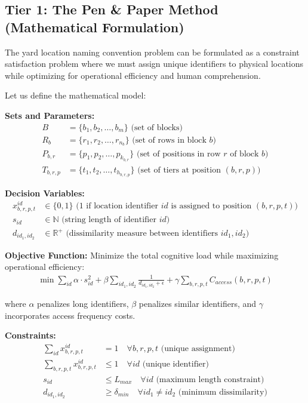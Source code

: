 \documentclass{article}
\begin{document}
\subsection{Tier 1: The Pen \& Paper Method (Mathematical Formulation)}

The yard location naming convention problem can be formulated as a constraint satisfaction problem where we must assign unique identifiers to physical locations while optimizing for operational efficiency and human comprehension.

Let us define the mathematical model:

\textbf{Sets and Parameters:}
\begin{align}
B &= \{b_1, b_2, \ldots, b_m\} \text{ (set of blocks)} \\
R_b &= \{r_1, r_2, \ldots, r_{n_b}\} \text{ (set of rows in block } b\text{)} \\
P_{b,r} &= \{p_1, p_2, \ldots, p_{k_{b,r}}\} \text{ (set of positions in row } r \text{ of block } b\text{)} \\
T_{b,r,p} &= \{t_1, t_2, \ldots, t_{h_{b,r,p}}\} \text{ (set of tiers at position } (b,r,p)\text{)}
\end{align}

\textbf{Decision Variables:}
\begin{align}
x_{b,r,p,t}^{id} &\in \{0,1\} \text{ (1 if location identifier } id \text{ is assigned to position } (b,r,p,t)\text{)} \\
s_{id} &\in \mathbb{N} \text{ (string length of identifier } id\text{)} \\
d_{id_1,id_2} &\in \mathbb{R}^+ \text{ (dissimilarity measure between identifiers } id_1, id_2\text{)}
\end{align}

\textbf{Objective Function:}
Minimize the total cognitive load while maximizing operational efficiency:
\begin{align}
\min \sum_{id} \alpha \cdot s_{id}^2 + \beta \sum_{id_1,id_2} \frac{1}{d_{id_1,id_2} + \epsilon} + \gamma \sum_{b,r,p,t} C_{access}(b,r,p,t)
\end{align}

where $\alpha$ penalizes long identifiers, $\beta$ penalizes similar identifiers, and $\gamma$ incorporates access frequency costs.

\textbf{Constraints:}
\begin{align}
\sum_{id} x_{b,r,p,t}^{id} &= 1 \quad \forall b,r,p,t \text{ (unique assignment)} \\
\sum_{b,r,p,t} x_{b,r,p,t}^{id} &\leq 1 \quad \forall id \text{ (unique identifier)} \\
s_{id} &\leq L_{max} \quad \forall id \text{ (maximum length constraint)} \\
d_{id_1,id_2} &\geq \delta_{min} \quad \forall id_1 \neq id_2 \text{ (minimum dissimilarity)}
\end{align}
\end{document}
